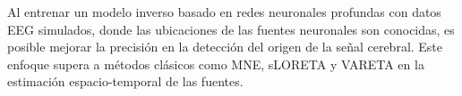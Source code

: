 Al entrenar un modelo inverso basado en redes neuronales profundas con datos EEG simulados, donde las ubicaciones de las fuentes neuronales son conocidas, es posible mejorar la precisión en la detección del origen de la señal cerebral. Este enfoque supera a métodos clásicos como MNE, sLORETA y VARETA en la estimación espacio-temporal de las fuentes.